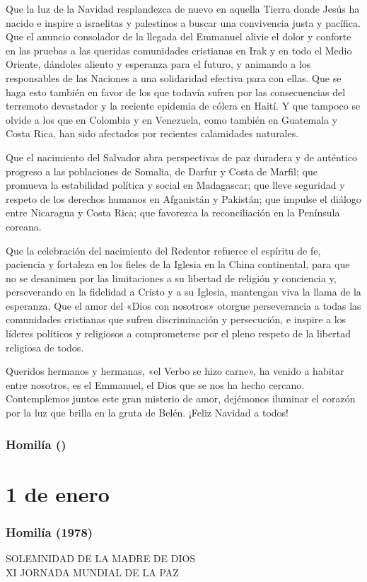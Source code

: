 Que la luz de la Navidad resplandezca de nuevo en aquella Tierra donde
Jesús ha nacido e inspire a israelitas y palestinos a buscar una
convivencia justa y pacífica. Que el anuncio consolador de la llegada
del Emmanuel alivie el dolor y conforte en las pruebas a las queridas
comunidades cristianas en Irak y en todo el Medio Oriente, dándoles
aliento y esperanza para el futuro, y animando a los responsables de las
Naciones a una solidaridad efectiva para con ellas. Que se haga esto
también en favor de los que todavía sufren por las consecuencias del
terremoto devastador y la reciente epidemia de cólera en Haití. Y que
tampoco se olvide a los que en Colombia y en Venezuela, como también en
Guatemala y Costa Rica, han sido afectados por recientes calamidades
naturales.

Que el nacimiento del Salvador abra perspectivas de paz duradera y de
auténtico progreso a las poblaciones de Somalia, de Darfur y Costa de
Marfil; que promueva la estabilidad política y social en Madagascar; que
lleve seguridad y respeto de los derechos humanos en Afganistán y
Pakistán; que impulse el diálogo entre Nicaragua y Costa Rica; que
favorezca la reconciliación en la Península coreana.

Que la celebración del nacimiento del Redentor refuerce el espíritu de
fe, paciencia y fortaleza en los fieles de la Iglesia en la China
continental, para que no se desanimen por las limitaciones a su libertad
de religión y conciencia y, perseverando en la fidelidad a Cristo y a su
Iglesia, mantengan viva la llama de la esperanza. Que el amor del «Dios
con nosotros» otorgue perseverancia a todas las comunidades cristianas
que sufren discriminación y persecución, e inspire a los líderes
políticos y religiosos a comprometerse por el pleno respeto de la
libertad religiosa de todos.

Queridos hermanos y hermanas, «el Verbo se hizo carne», ha venido a
habitar entre nosotros, es el Emmanuel, el Dios que se nos ha hecho
cercano. Contemplemos juntos este gran misterio de amor, dejémonos
iluminar el corazón por la luz que brilla en la gruta de Belén. ¡Feliz
Navidad a todos!
\subsubsection{Homilía ()}

\section{1 de enero}
\subsubsection{Homilía (1978)}
SOLEMNIDAD DE LA MADRE DE DIOS\\
XI JORNADA MUNDIAL DE LA PAZ

